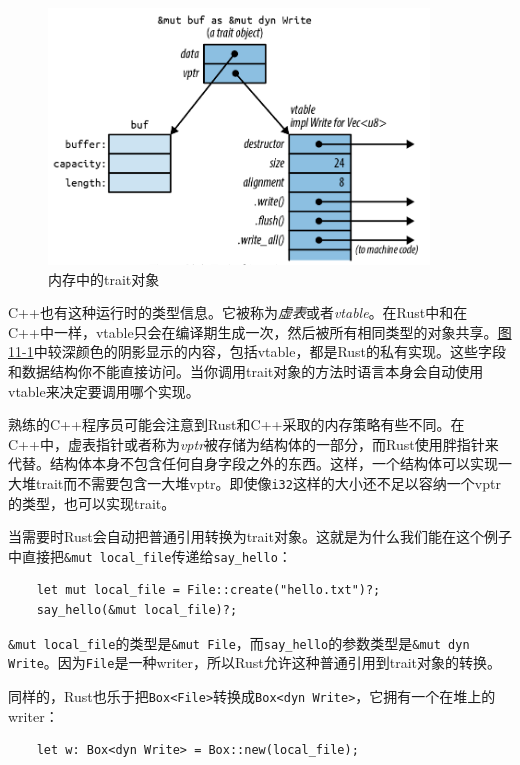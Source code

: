\begin{figure}[htbp]
    \centering
    \includegraphics[width=0.9\textwidth]{../img/f11-1.png}
    \caption{内存中的trait对象}
    \label{f11-1}
\end{figure}

C++也有这种运行时的类型信息。它被称为\emph{虚表}或者\emph{vtable}。在Rust中和在C++中一样，vtable只会在编译期生成一次，然后被所有相同类型的对象共享。\hyperref[f11-1]{图11-1}中较深颜色的阴影显示的内容，包括vtable，都是Rust的私有实现。这些字段和数据结构你不能直接访问。当你调用trait对象的方法时语言本身会自动使用vtable来决定要调用哪个实现。

熟练的C++程序员可能会注意到Rust和C++采取的内存策略有些不同。在C++中，虚表指针或者称为\emph{vptr}被存储为结构体的一部分，而Rust使用胖指针来代替。结构体本身不包含任何自身字段之外的东西。这样，一个结构体可以实现一大堆trait而不需要包含一大堆vptr。即使像\texttt{i32}这样的大小还不足以容纳一个vptr的类型，也可以实现trait。

当需要时Rust会自动把普通引用转换为trait对象。这就是为什么我们能在这个例子中直接把\texttt{\&mut local\_file}传递给\texttt{say\_hello}：
\begin{verbatim}
    let mut local_file = File::create("hello.txt")?;
    say_hello(&mut local_file)?;
\end{verbatim}

\texttt{\&mut local\_file}的类型是\texttt{\&mut File}，而\texttt{say\_hello}的参数类型是\texttt{\&mut dyn Write}。因为\texttt{File}是一种writer，所以Rust允许这种普通引用到trait对象的转换。

同样的，Rust也乐于把\texttt{Box<File>}转换成\texttt{Box<dyn Write>}，它拥有一个在堆上的writer：
\begin{verbatim}
    let w: Box<dyn Write> = Box::new(local_file);
\end{verbatim}

